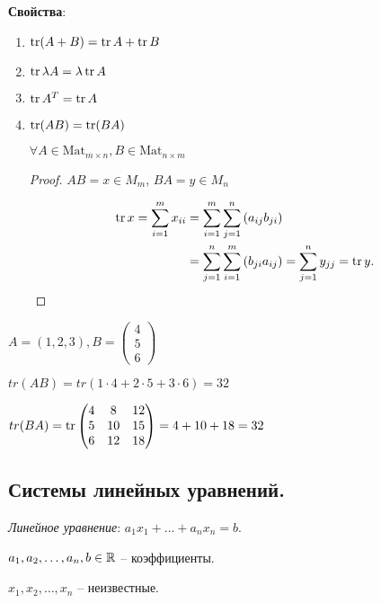 \textbf{Свойства}:
\begin{enumerate}
\item $\operatorname{\mathop{\mathrm{tr}}}(A + B) = \operatorname{\mathop{\mathrm{tr}}} A + \operatorname{\mathop{\mathrm{tr}}} B$
\item $\operatorname{\mathop{\mathrm{tr}}} \lambda A = \lambda \operatorname{\mathop{\mathrm{tr}}} A$
\item $\operatorname{\mathop{\mathrm{tr}}} A^T = \operatorname{\mathop{\mathrm{tr}}} A$
\item $\operatorname{\mathop{\mathrm{tr}}}(AB) = \operatorname{\mathop{\mathrm{tr}}}(BA)$

    $\forall A \in \text{Mat}_{m \times n}, B \in \text{Mat}_{n \times m}$

    \begin{proof}
        $AB = x \in M_m$, $BA = y \in M_n$

        \begin{align*}
            \operatorname{\mathop{\mathrm{tr}}} x 
            = \sum_{i = 1}^{m} x_{ii} 
            &= \sum_{i = 1}^{m} \sum_{j = 1}^{n} \left(a_{ij} b_{ji}\right) \\
            &= \sum_{j = 1}^{n} \sum_{i = 1}^{m} \left(b_{ji} a_{ij}\right) 
            = \sum_{j = 1}^{n} y_{jj} 
            = \operatorname{\mathop{\mathrm{tr}}} y
        .\end{align*}
    \end{proof}
\end{enumerate}

\begin{example}
    $A = (1, 2, 3), B = \begin{pmatrix}4 \\ 5 \\ 6\end{pmatrix}$

    $tr(AB) = tr(1 \cdot 4 + 2 \cdot 5 + 3 \cdot 6) = 32$

    $tr(BA) = \operatorname{\mathop{\mathrm{tr}}} \begin{pmatrix} 4 & 8 & 12 \\ 5 & 10 & 15 \\ 6 & 12 & 18 \end{pmatrix} = 4 + 10 + 18 = 32$
\end{example}


\subsection{Системы линейных уравнений.}

\textit{Линейное уравнение}: $a_1 x_1 + \dots + a_n x_n = b$.

$a_1, a_2, \dots, a_n, b \in \mathbb{R}$ -- коэффициенты.

$x_1, x_2, \dots, x_n$ -- неизвестные.

